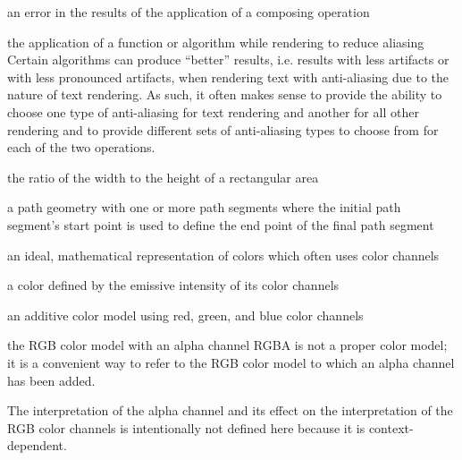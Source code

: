 an error in the results of the application of a composing operation 

the application of a function or algorithm while rendering to 
reduce aliasing
\enternote
Certain algorithms can produce ``better'' results, i.e. results with less 
artifacts or with less pronounced artifacts, when rendering text with 
anti-aliasing due to the nature of text rendering. As such, it often makes 
sense to provide the ability to choose one type of anti-aliasing for text 
rendering and another for all other rendering and to provide different sets of 
anti-aliasing types to choose from for each of the two operations.
\exitnote

the ratio of the width to the height of a rectangular area

a path geometry with one or more path segments where the initial path segment's start point is used to define the end point of the final path segment

an ideal, mathematical representation of colors which often uses color channels

a color defined by the emissive intensity of its color channels

an additive color model using red, green, and blue color channels

the RGB color model with an alpha channel
\enternote
RGBA is not a proper color model; it is a convenient way to refer to the RGB color model to which an alpha channel has been added.

The interpretation of the alpha channel and its effect on the interpretation of the RGB color channels is intentionally not defined here because it is context-dependent.
\exitnote

